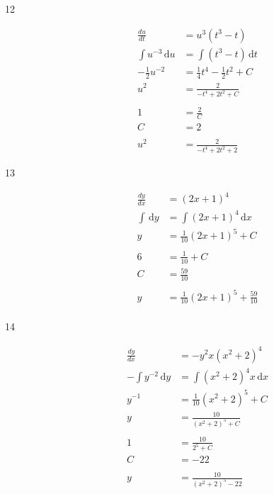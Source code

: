 \documentclass{exam}
\begin{document}
\begin{description}
\item[12]
\begin{align*}
  \frac{du}{dt} &= u^3 \left( t^3 - t \right) \\  
  \int u^{-3} \, \mathrm{d}u &= \int \left( t^3 - t \right) \, \mathrm{d}t \\
  - \frac{1}{2} u^{-2} &= \frac{1}{4} t^4 - \frac{1}{2} t^2 + C \\
  u^2 &= \frac{2}{-t^4 + 2t^2 + C} \\
\\
  1 &= \frac{2}{C} \\
  C &= 2 \\
\\
  u^2 &= \frac{2}{-t^4 + 2t^2 + 2}
\end{align*}

\item[13]
\begin{align*}
  \frac{dy}{dx} &= \left( 2x + 1 \right)^4 \\  
  \int \, \mathrm{d}y &= \int \left( 2x + 1 \right)^4 \, \mathrm{d}x \\
  y &= \frac{1}{10} \left( 2x + 1 \right)^5 + C \\
\\
  6 &= \frac{1}{10} + C \\
  C &= \frac{59}{10} \\
\\
  y &= \frac{1}{10} \left( 2x + 1 \right)^5 + \frac{59}{10} \\
\end{align*}

\item[14]
\begin{align*}
  \frac{dy}{dx} &= -y^2 x \left(x^2 + 2 \right)^4 \\  
  - \int y^{-2} \, \mathrm{d}y &= \int \left( x^2 + 2 \right)^4 x \, \mathrm{d}x \\
  y^{-1} &= \frac{1}{10} \left( x^2 + 2 \right)^5 + C \\
  y &= \frac{10}{\left( x^2 + 2 \right)^5 + C} \\
\\
  1 &= \frac{10}{2^5 + C} \\
  C &= -22 \\
\\
  y &= \frac{10}{\left( x^2 + 2 \right)^5 - 22} \\
\end{align*}


\end{description}
\end{document}
